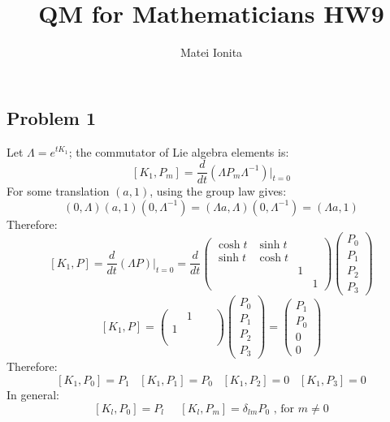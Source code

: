 \documentclass[12 pt]{article}
\title{QM for Mathematicians HW9}
\author{Matei Ionita}
\begin{document}
  \maketitle


\subsection*{Problem 1}
Let $\Lambda = e^{tK_1}$; the commutator of Lie algebra elements is:
\[     [K_1 , P_m ] = \frac{d}{dt} (\Lambda P_m \Lambda^{-1}) |_{t=0}      \]
For some translation $(a,1)$, using the group law gives:
\[        (0,\Lambda) (a,1) (0,\Lambda^{-1}) =  (\Lambda a , \Lambda) (0, \Lambda^{-1}) = (\Lambda a, 1)    \]
Therefore:
\[        [K_1, P] =    \frac{d}{dt} (\Lambda P) |_{t=0} = \frac{d}{dt}  \left( \begin{array} {cccc} 
\cosh t & \sinh t & & \\ 
\sinh t & \cosh t & & \\
 & & 1 & \\
 & & & 1  
\end{array} \right) \left(  \begin{array} {c} P_0 \\ P_1 \\ P_2 \\ P_3   \end{array}   \right)     \]
\[         [K_1, P] =  \left( \begin{array} {cccc} 
 & 1 & & \\ 
1 &  & & \\
 & & & \\
 & & & 
\end{array} \right) \left(  \begin{array} {c} P_0 \\ P_1 \\ P_2 \\ P_3   \end{array}   \right)   =   \left(  \begin{array} {c} P_1 \\ P_0 \\ 0 \\ 0   \end{array}   \right)     \]
Therefore:
\[   [K_1, P_0] = P_1   \;\;\;  [K_1, P_1] = P_0 \;\;\; [K_1, P_2] = 0 \;\;\; [K_1, P_3] = 0    \]
In general:
\[        [K_l , P_0] = P_l   \;\;\;\;\; [K_l, P_m] = \delta_{lm} P_0 \text{ , for } m\neq 0   \]
\end{document}
